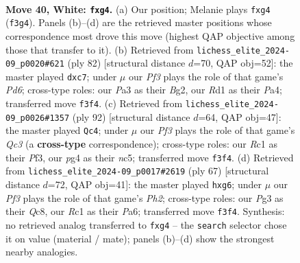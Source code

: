 \documentclass[11pt]{article}
\begin{document}
\clearpage

\begin{figure}[p]\centering
\begin{subfigure}{0.46\textwidth}\centering
\resizebox{\linewidth}{!}{%
\newchessgame
\chessboard[
  setfen={r5k1/pp6/n2Q4/2pP1p2/6p1/P4PPq/1P6/2RR2K1 w - - 0 40},
  showmover=false,
  pgfstyle=straightmove, color=movearrow, markmove={f3-g4}
]}
\caption{}
\end{subfigure}\hfill
\begin{subfigure}{0.46\textwidth}\centering
\resizebox{\linewidth}{!}{%
\newchessgame
\chessboard[
  setfen={3r4/2p2k2/1p1P3R/pPn1pq2/P5p1/4Q1P1/6B1/6K1 w - - 1 42},
  showmover=false,
  pgfstyle=straightmove, color=movearrow, markmove={d6-c7}
]}
\caption{}
\end{subfigure}
\\[4pt]
\begin{subfigure}{0.46\textwidth}\centering
\resizebox{\linewidth}{!}{%
\newchessgame
\chessboard[
  setfen={6k1/1q3p2/1p3Rp1/2n4p/p3P3/P1Q2PP1/7P/3R2K1 w - - 0 47},
  showmover=false,
  pgfstyle=straightmove, color=movearrow, markmove={c3-c4}
]}
\caption{}
\end{subfigure}\hfill
\begin{subfigure}{0.46\textwidth}\centering
\resizebox{\linewidth}{!}{%
\newchessgame
\chessboard[
  setfen={2qr2k1/7p/p5P1/5pP1/3r4/1P4P1/P2NQP2/4R1K1 b - - 0 34},
  showmover=false,
  pgfstyle=straightmove, color=movearrow, markmove={h7-g6}
]}
\caption{}
\end{subfigure}
\caption{\textbf{Move 40, White: \texttt{fxg4}.} (a) Our position; Melanie plays \texttt{fxg4} (\texttt{f3g4}). Panels (b)--(d) are the retrieved master positions whose correspondence most drove this move (highest QAP objective among those that transfer to it). (b) Retrieved from \texttt{lichess\_elite\_2024-09\_p0020\#621} (ply 82) [structural distance $d$=70, QAP obj=52]: the master played \texttt{dxc7}; under $\mu$ our \emph{Pf3} plays the role of that game's \emph{Pd6}; cross-type roles: our \emph{P}a3 as their \emph{B}g2, our \emph{R}d1 as their \emph{P}a4; transferred move \texttt{f3f4}. (c) Retrieved from \texttt{lichess\_elite\_2024-09\_p0026\#1357} (ply 92) [structural distance $d$=64, QAP obj=47]: the master played \texttt{Qc4}; under $\mu$ our \emph{Pf3} plays the role of that game's \emph{Qc3} (a \textbf{cross-type} correspondence); cross-type roles: our \emph{R}c1 as their \emph{P}f3, our \emph{p}g4 as their \emph{n}c5; transferred move \texttt{f3f4}. (d) Retrieved from \texttt{lichess\_elite\_2024-09\_p0017\#2619} (ply 67) [structural distance $d$=72, QAP obj=41]: the master played \texttt{hxg6}; under $\mu$ our \emph{Pf3} plays the role of that game's \emph{Ph2}; cross-type roles: our \emph{P}g3 as their \emph{Q}c8, our \emph{R}c1 as their \emph{P}a6; transferred move \texttt{f3f4}. Synthesis: no retrieved analog transferred to \texttt{fxg4} -- the \texttt{search} selector chose it on value (material / mate); panels (b)--(d) show the strongest nearby analogies.}
\label{fig:thought-m78}
\end{figure}
\end{document}
